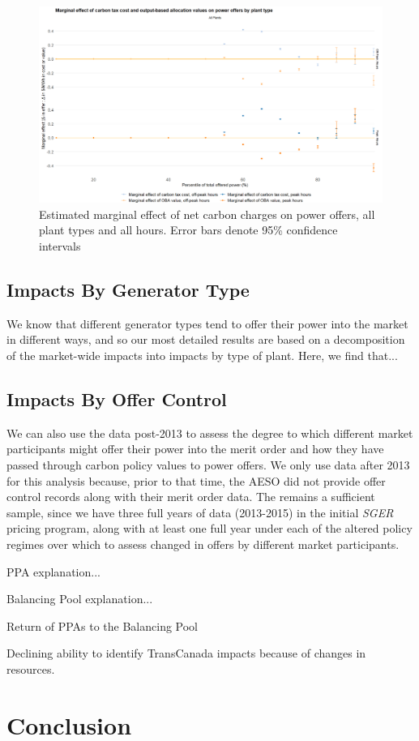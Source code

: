 \documentclass[12pt]{article}
\newcommand{\SGER}{\textit{SGER} }
\begin{document}
\begin{figure}[!htb]
    \centering
     \includegraphics[width=.9\textwidth]{../images/all_plants.png}
    \caption{Estimated marginal effect of net carbon charges on power offers, all plant types and all hours. Error bars denote 95\% confidence intervals}
    \label{fig:decomp_peaks}
\end{figure}





\subsection{Impacts By Generator Type}
We know that different generator types tend to offer their power into the market in different ways, and so our most detailed results are based on a decomposition of the market-wide impacts into impacts by type of plant. Here, we find that...

\subsection{Impacts By Offer Control}
We can also use the data post-2013 to assess the degree to which different market participants might offer their power into the merit order and how they have passed through carbon policy values to power offers. We only use data after 2013 for this analysis because, prior to that time, the AESO did not provide offer control records along with their merit order data. The remains a sufficient sample, since we have three full years of data (2013-2015) in the initial \SGER pricing program, along with at least one full year under each of the altered policy regimes over which to assess changed in offers by different market participants.

PPA explanation...

Balancing Pool explanation...

Return of PPAs to the Balancing Pool

Declining ability to identify TransCanada impacts because of changes in resources.





\section{Conclusion}




\end{document}
